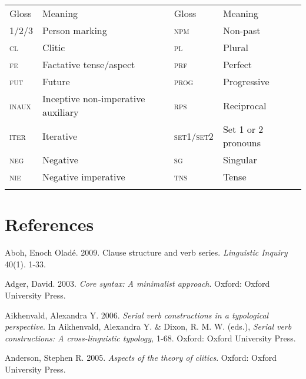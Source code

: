 \documentclass[output=paper]{langsci/langscibook}
\begin{document}
\begin{tabularx}{\textwidth}{XXXX}
\lsptoprule

{\mdseries Gloss} & {\mdseries Meaning} & {\mdseries Gloss} & {\mdseries Meaning}\\
{\scshape 1/2/3} & {\mdseries Person marking} & {\scshape npm} & {\mdseries Non-past }\\
{\scshape cl} & {\mdseries Clitic} & {\scshape pl} & {\mdseries Plural }\\
{\scshape fe} & {\mdseries Factative tense/aspect} & {\scshape prf} & {\mdseries Perfect }\\
{\scshape fut} & {\mdseries Future} & {\scshape prog} & {\mdseries Progressive}\\
{\scshape inaux} & {\mdseries Inceptive non-imperative auxiliary} & {\scshape rps} & {\mdseries Reciprocal }\\
{\scshape iter} & {\mdseries Iterative} & {\scshape set1/set2} & {\mdseries Set 1 or 2 pronouns}\\
{\scshape neg} & {\mdseries Negative} & {\scshape sg} & {\mdseries Singular }\\
{\scshape nie} & {\mdseries Negative imperative} & {\scshape tns} & {\mdseries Tense }\\
\lspbottomrule
\end{tabularx}
\chapter{References}

\begin{styleNoSpacing}
Aboh, Enoch Oladé. 2009. Clause structure and verb series. \textit{Linguistic Inquiry} 40(1). 1-33.
\end{styleNoSpacing}

\begin{styleNoSpacing}
Adger, David. 2003.\textit{ Core syntax: A minimalist approach}. Oxford: Oxford University Press.
\end{styleNoSpacing}

\begin{styleNoSpacing}
Aikhenvald, Alexandra Y. 2006. \textit{Serial verb constructions in a typological perspective}. In Aikhenvald, Alexandra Y. \& Dixon, R. M. W. (eds.), \textit{Serial verb constructions: A cross-linguistic typology,} 1-68. Oxford: Oxford University Press. 
\end{styleNoSpacing}

\begin{styleNoSpacing}
Anderson, Stephen R. 2005. \textit{Aspects of the theory of clitics}. Oxford: Oxford University Press.
\end{styleNoSpacing}
\end{document}
